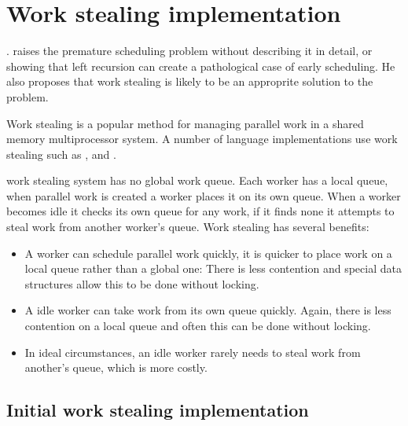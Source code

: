 \section{Work stealing implementation}
\label{sec:work_stealing}

.
\citet{wangp-hons} raises the premature scheduling problem without
describing it in detail,
or showing that left recursion can create a pathological case of early scheduling.
He also proposes that work stealing is likely to be an approprite solution to
the problem.

Work stealing is a popular method for managing parallel work in a shared
memory multiprocessor system.
A number of language implementations use work stealing such as
\citet{blumofe:1999:work-stealing}, and
\citet{halstead:1985:multilisp}.

work stealing system has no global work queue.
Each worker has a local queue, when parallel work is created a worker
places it on its own queue.
When a worker becomes idle it checks its own queue for any work,
if it finds none it attempts to steal work from another worker's queue.
Work stealing has several benefits:

\begin{itemize}

    \item
    A worker can schedule parallel work quickly,
    it is quicker to place work on a local queue rather than a global
    one:
    There is less contention and special data structures allow this to
    be done without locking.

    \item
    A idle worker can take work from its own queue quickly.
    Again, there is less contention on a local queue and often this can
    be done without locking.

    \item
    In ideal circumstances,
    an idle worker rarely needs to steal work from another's queue,
    which is more costly.

\end{itemize}

\subsection{Initial work stealing implementation}

